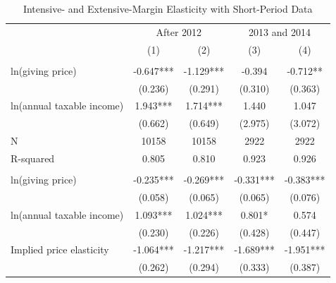 \documentclass[
  11pt,
  a4paper,
]{article}
\begin{document}
  \begin{table}

  \caption{\label{tab:kableShortElasticity2}Intensive- and Extensive-Margin Elasticity with Short-Period Data}
  \centering
  \fontsize{7}{9}\selectfont
  \begin{threeparttable}
  \begin{tabular}[t]{lcccc}
  \toprule
  \multicolumn{1}{c}{ } & \multicolumn{2}{c}{After 2012} & \multicolumn{2}{c}{2013 and 2014} \\
  \cmidrule(l{3pt}r{3pt}){2-3} \cmidrule(l{3pt}r{3pt}){4-5}
   & (1) & (2) & (3) & (4)\\
  \midrule
  \addlinespace[0.3em]
  \multicolumn{5}{l}{\textbf{Intensive-Margin Elasticity}}\\
  \hspace{1em}ln(giving price) & -0.647*** & -1.129*** & -0.394 & -0.712**\\
  \hspace{1em} & (0.236) & (0.291) & (0.310) & (0.363)\\
  \hspace{1em}ln(annual taxable income) & 1.943*** & 1.714*** & 1.440 & 1.047\\
  \hspace{1em} & (0.662) & (0.649) & (2.975) & (3.072)\\
  \hspace{1em}N & 10158 & 10158 & 2922 & 2922\\
  \hspace{1em}R-squared & 0.805 & 0.810 & 0.923 & 0.926\\
  \addlinespace[0.3em]
  \multicolumn{5}{l}{\textbf{Extensive-Margin Elasticity}}\\
  \hspace{1em}ln(giving price) & -0.235*** & -0.269*** & -0.331*** & -0.383***\\
  \hspace{1em} & (0.058) & (0.065) & (0.065) & (0.076)\\
  \hspace{1em}ln(annual taxable income) & 1.093*** & 1.024*** & 0.801* & 0.574\\
  \hspace{1em} & (0.230) & (0.226) & (0.428) & (0.447)\\
  \hspace{1em}Implied price elasticity & -1.064*** & -1.217*** & -1.689*** & -1.951***\\
  \hspace{1em} & (0.262) & (0.294) & (0.333) & (0.387)\\

\end{tabular}
\end{threeparttable}
\end{table}
\end{document}
